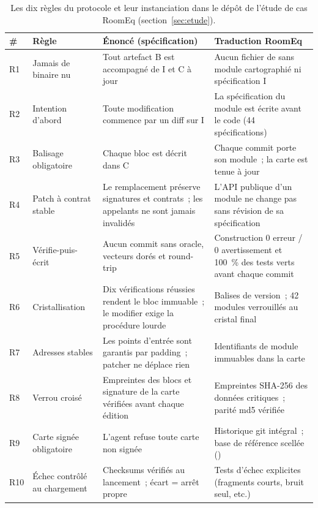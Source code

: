 \begin{table}[t]
\centering\small
\caption{Les dix règles du protocole et leur instanciation dans le dépôt de
l’étude de cas RoomEq (section~\ref{sec:etude}).}
\label{tab:regles}
\begin{tabularx}{\textwidth}{@{}l l Y Y@{}}
\toprule
\textbf{\#} & \textbf{Règle} & \textbf{Énoncé (spécification)} &
\textbf{Traduction RoomEq} \\
\midrule
R1 & Jamais de binaire nu & Tout artefact B est accompagné de I et C à jour
& Aucun fichier de  sans module cartographié ni spécification I \\
R2 & Intention d’abord & Toute modification commence par un diff sur I &
La spécification du module est écrite avant le code (44 spécifications) \\
R3 & Balisage obligatoire & Chaque bloc est décrit dans C & Chaque commit
porte son module~; la carte est tenue à jour \\
R4 & Patch à contrat stable & Le remplacement préserve signatures et
contrats~; les appelants ne sont jamais invalidés & L’API publique d’un
module ne change pas sans révision de sa spécification \\
R5 & Vérifie-puis-écrit & Aucun commit sans oracle, vecteurs dorés et
round-trip & Construction 0 erreur / 0 avertissement et 100~\% des tests
verts avant chaque commit \\
R6 & Cristallisation & Dix vérifications réussies rendent le bloc
immuable~; le modifier exige la procédure lourde & Balises de version~;
42 modules verrouillés au cristal final \\
R7 & Adresses stables & Les points d’entrée sont garantis par padding~;
patcher ne déplace rien & Identifiants de module 
immuables dans la carte \\
R8 & Verrou croisé & Empreintes des blocs et signature de la carte
vérifiées avant chaque édition & Empreintes SHA-256 des données critiques~;
parité md5 vérifiée \\
R9 & Carte signée obligatoire & L’agent refuse toute carte non signée &
Historique git intégral~; base de référence scellée () \\
R10 & Échec contrôlé au chargement & Checksums vérifiés au lancement~;
écart = arrêt propre & Tests d’échec explicites (fragments courts, bruit
seul, etc.) \\
\bottomrule
\end{tabularx}
\end{table}

